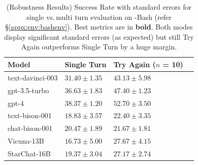 \begin{table}[H]
\centering
\begin{tabular}{ll|ll}
\toprule
      Model & {Single Turn} & {Try Again ($n$ = 10)} \\
\midrule
    text-davinci-003 & $31.40 \pm 1.35$ & $43.13 \pm 5.98$ \\
    gpt-3.5-turbo & $36.63 \pm 1.83$ & $47.40 \pm 1.23$\\
    gpt-4 & $\mathbf{38.37 \pm 1.20}$ & $\mathbf{52.70 \pm 3.50}$\\
    text-bison-001 & $18.83 \pm 3.57$& $22.40 \pm 3.35$\\
    chat-bison-001 & $20.47 \pm 1.89$& $21.67 \pm 1.81$\\
    Vicuna-13B & $16.73 \pm 5.00$ & $27.67 \pm 4.15$\\
    StarChat-16B & $19.37 \pm 3.04$ & $27.17 \pm 2.74$\\
\bottomrule
\end{tabular}
\vspace{0.5em}
\caption{(Robustness Results) Success Rate with standard errors for single vs.\,multi turn evaluation on \benchmark{}-Bash (refer \S\ref{appx:env:bashenv}). Best metrics are in \textbf{bold}. Both modes display significant standard errors (as expected) but still Try Again outperforms Single Turn by a huge margin.
}
\label{table:bash-error-bars}
\vspace{-1.5em}
\end{table}